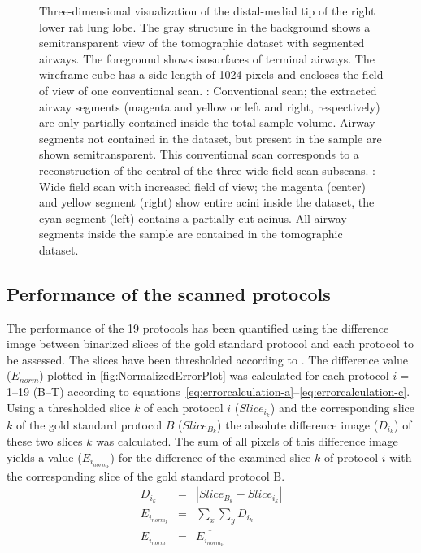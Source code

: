 \begin{figure}
{{%
			\label{subfig:convvswfs_wfs}%
		}%
	}%
	\caption[Three-dimensional visualization of the distal-medial tip of the right lower rat lung lobe]{Three-dimensional visualization of the distal-medial tip of the right lower rat lung lobe. The gray structure in the background shows a semitransparent view of the tomographic dataset with segmented airways. The foreground shows isosurfaces of terminal airways. The wireframe cube has a side length of 1024 pixels and encloses the field of view of one conventional scan. %
	: Conventional scan; the extracted airway segments (magenta and yellow or left and right, respectively) are only partially contained inside the total sample volume. Airway segments not contained in the dataset, but present in the sample are shown semitransparent. This conventional scan corresponds to a reconstruction of the central of the three wide field scan subscans. %
	: Wide field scan with increased field of view; the magenta (center) and yellow segment (right) show entire acini inside the dataset, the cyan segment (left) contains a partially cut acinus. All airway segments inside the sample are contained in the tomographic dataset.}
	\label{fig:s2-wfs}
\end{figure}

\subsection{Performance of the scanned protocols}
The performance of the 19 protocols has been quantified using the difference image between binarized slices of the gold standard protocol and each protocol to be assessed. The slices have been thresholded according to \citet{Otsu1979}. The difference value ($E_{norm}$) plotted in \autoref{fig:NormalizedErrorPlot} was calculated for each protocol $i=$1--19 (B--T) according to equations~\ref{eq:errorcalculation-a}--\ref{eq:errorcalculation-c}. Using a thresholded slice $k$ of each protocol $i$ ($Slice_{i_{k}}$) and the corresponding slice $k$ of the gold standard protocol $B$ ($Slice_{B_{k}}$) the absolute difference image ($D_{i_{k}}$) of these two slices $k$ was calculated. The sum of all pixels of this difference image yields a value ($E_{i_{norm_{k}}}$) for the difference of the examined slice $k$ of protocol $i$ with the corresponding slice of the gold standard protocol B.
\begin{eqnarray}
	D_{i_{k}} &=& |Slice_{B_{k}}-Slice_{i_{k}}|\label{eq:errorcalculation-a}\\%
	E_{i_{norm_{k}}} &=& \sum_{x}\sum_{y} D_{i_{k}}\label{eq:errorcalculation-b}\\%
	E_{i_{norm}} &=& \overline{E_{i_{norm_{k}}}}\label{eq:errorcalculation-c}%
\end{eqnarray}

